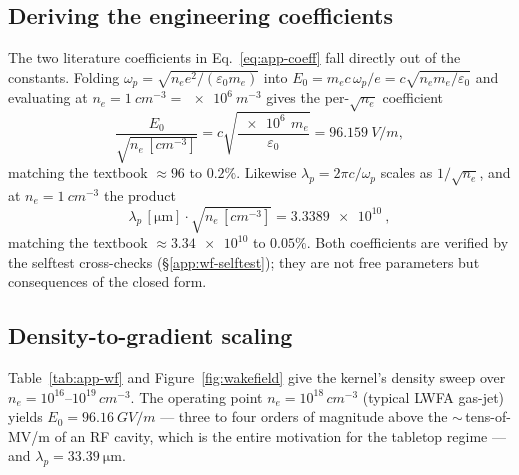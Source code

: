 \subsection{Deriving the engineering coefficients}
\label{app:wf-coeff}

The two literature coefficients in Eq.~\ref{eq:app-coeff} fall directly
out of the constants. Folding $\omega_p = \sqrt{n_e e^2/(\varepsilon_0
m_e)}$ into $E_0 = m_e c\,\omega_p/e = c\sqrt{n_e m_e/\varepsilon_0}$ and
evaluating at $n_e = \SI{1}{cm^{-3}} = \SI{e6}{m^{-3}}$ gives the
per-$\sqrt{n_e}$ coefficient
\begin{equation}
\frac{E_0}{\sqrt{n_e\,[\si{cm^{-3}}]}}
  = c\sqrt{\frac{\SI{e6}{}\,m_e}{\varepsilon_0}}
  = \SI{96.159}{V/m},
\end{equation}
matching the textbook $\approx\!96$ to $0.2\%$. Likewise
$\lambda_p = 2\pi c/\omega_p$ scales as $1/\sqrt{n_e}$, and at
$n_e=\SI{1}{cm^{-3}}$ the product
\begin{equation}
\lambda_p\,[\si{\micro\meter}]\cdot\sqrt{n_e\,[\si{cm^{-3}}]}
  = \SI{3.3389e10}{},
\end{equation}
matching the textbook $\approx\!\num{3.34e10}$ to $0.05\%$. Both
coefficients are verified by the selftest cross-checks
(\S\ref{app:wf-selftest}); they are not free parameters but consequences
of the closed form.

\subsection{Density-to-gradient scaling}
\label{app:wf-scaling}

Table~\ref{tab:app-wf} and Figure~\ref{fig:wakefield} give the kernel's
density sweep over $n_e = 10^{16}$--$10^{19}\,\si{cm^{-3}}$. The
operating point $n_e=10^{18}\,\si{cm^{-3}}$ (typical LWFA gas-jet) yields
$E_0 = \SI{96.16}{GV/m}$ --- three to four orders of magnitude above the
$\sim$\,tens-of-\si{MV/m} of an RF cavity, which is the entire motivation
for the tabletop regime --- and $\lambda_p = \SI{33.39}{\micro\meter}$.

